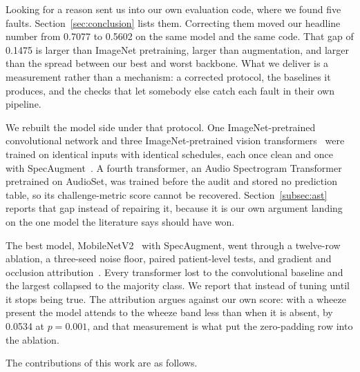 \documentclass[journal,onecolumn]{IEEEtran}
\begin{document}
Looking for a reason sent us into our own evaluation code, where we found five faults.
Section~\ref{sec:conclusion} lists them. Correcting them moved our headline number from 0.7077
to 0.5602 on the same model and the same code. That gap of 0.1475 is larger than ImageNet
pretraining, larger than augmentation, and larger than the spread between our best and worst
backbone. What we deliver is a measurement rather than a mechanism: a corrected protocol, the
baselines it produces, and the checks that let somebody else catch each fault in their own
pipeline.

We rebuilt the model side under that protocol. One ImageNet-pretrained convolutional network
and three ImageNet-pretrained vision
transformers~\cite{dosovitskiy2021vit,liu2021swin,touvron2021deit} were trained on identical
inputs with identical schedules, each once clean and once with
SpecAugment~\cite{park2019specaugment}. A fourth transformer, an Audio Spectrogram
Transformer~\cite{gong2021ast} pretrained on AudioSet, was trained before the audit and stored
no prediction table, so its challenge-metric score cannot be recovered.
Section~\ref{subsec:ast} reports that gap instead of repairing it, because it is our own
argument landing on the one model the literature says should have won.

The best model, MobileNetV2~\cite{sandler2018mobilenetv2} with SpecAugment, went through a
twelve-row ablation, a three-seed noise floor, paired patient-level tests, and gradient and
occlusion attribution~\cite{selvaraju2017gradcam}. Every transformer lost to the convolutional
baseline and the largest collapsed to the majority class. We report that instead of tuning
until it stops being true. The attribution argues against our own score: with a wheeze present
the model attends to the wheeze band less than when it is absent, by 0.0534 at $p = 0.001$, and
that measurement is what put the zero-padding row into the ablation.

The contributions of this work are as follows.
\end{document}
